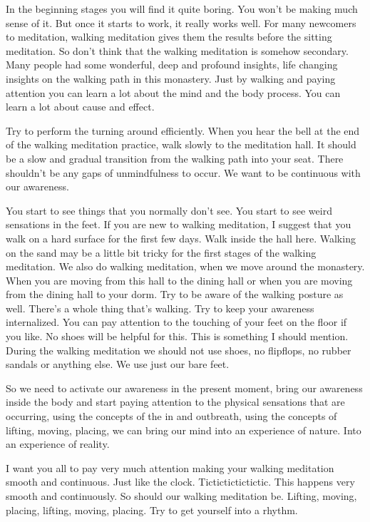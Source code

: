\documentclass[letterpaper,10pt,english]{sphinxmanual}
\begin{document}
\sphinxAtStartPar
In  the  beginning  stages  you  will  find  it  quite  boring.  You  won’t  be
making much sense of it. But once it starts to work, it really works well. For
many newcomers to meditation, walking meditation gives them the results
before the sitting meditation. So don’t think that the walking meditation is
somehow secondary. Many people had some wonderful, deep and profound
insights, life changing insights on the walking path in this monastery. Just
by walking and paying attention you can learn a lot about the mind and the
  body process. You can learn a lot about cause and effect.

\sphinxAtStartPar
Try to perform the turning around efficiently. When you hear the bell
at the end of the walking meditation practice, walk slowly to the meditation
hall. It should be a slow and gradual transition from the walking path into
your seat. There shouldn’t be any gaps of unmindfulness to occur. We want
to be continuous with our awareness.

\sphinxAtStartPar
You  start  to  see  things  that  you  normally  don’t  see. You  start  to  see
weird sensations in the feet. If you are new to walking meditation, I suggest
that you walk on a hard surface for the first few days. Walk inside the hall
here. Walking on the sand may be a little bit tricky for the first stages of the
walking meditation. We also do walking meditation, when we move around
the  monastery.  When  you  are  moving  from  this  hall  to  the  dining  hall  or
when you are moving from the dining hall to your dorm. Try to be aware
of the walking posture as well. There’s a whole thing that’s walking. Try to
keep your awareness internalized. You can pay attention to the touching of
your feet on the floor if you like. No shoes will be helpful for this. This is
something I should mention. During the walking meditation we should not
use shoes, no flip\sphinxhyphen{}flops, no rubber sandals or anything else. We use just our
bare feet.

\sphinxAtStartPar
So we need to activate our awareness in the present moment, bring our
awareness inside the body and start paying attention to the physical sensations that are occurring, using the concepts of the in\sphinxhyphen{} and out\sphinxhyphen{}breath, using
the concepts of lifting, moving, placing, we can bring our mind into an experience of nature. Into an experience of reality.

\sphinxAtStartPar
I want you all to pay very much attention making your walking meditation smooth and continuous. Just like the clock. Tic\sphinxhyphen{}tic\sphinxhyphen{}tic\sphinxhyphen{}tic\sphinxhyphen{}tic\sphinxhyphen{}tic. This
happens very smooth and continuously. So should our walking meditation
be.  Lifting,  moving,  placing,  lifting,  moving,  placing.  Try  to  get  yourself
into a rhythm.
\end{document}
